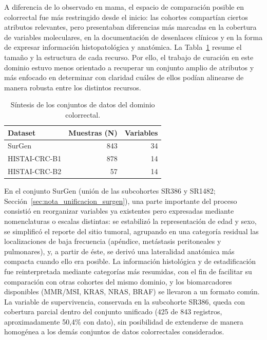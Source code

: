 A diferencia de lo observado en mama, el espacio de comparación posible en colorrectal fue más restringido desde el inicio: las cohortes compartían ciertos atributos relevantes, pero presentaban diferencias más marcadas en la cobertura de variables moleculares, en la documentación de desenlaces clínicos y en la forma de expresar información histopatológica y anatómica. La Tabla~\ref{tab:resumen_colorrectal} resume el tamaño y la estructura de cada recurso. Por ello, el trabajo de curación en este dominio estuvo menos orientado a recuperar un conjunto amplio de atributos y más enfocado en determinar con claridad cuáles de ellos podían alinearse de manera robusta entre los distintos recursos.

\begin{table}[H]
\centering
\caption{Síntesis de los conjuntos de datos del dominio colorrectal.}
\label{tab:resumen_colorrectal}
\small
\begin{tabular}{lrr}
\toprule
\textbf{Dataset} & \textbf{Muestras (N)} & \textbf{Variables} \\
\midrule
SurGen & 843 & 34 \\
HISTAI-CRC-B1 & 878 & 14 \\
HISTAI-CRC-B2 & 57 & 14 \\
\bottomrule
\end{tabular}
\end{table}

En el conjunto SurGen (unión de las subcohortes SR386 y SR1482; Sección~\ref{sec:nota_unificacion_surgen}), una parte importante del proceso consistió en reorganizar variables ya existentes pero expresadas mediante nomenclaturas o escalas distintas: se estabilizó la representación de edad y sexo, se simplificó el reporte del sitio tumoral, agrupando en una categoría residual las localizaciones de baja frecuencia (apéndice, metástasis peritoneales y pulmonares), y, a partir de éste, se derivó una lateralidad anatómica más compacta cuando ello era posible. La información histológica y de estadificación fue reinterpretada mediante categorías más resumidas, con el fin de facilitar su comparación con otras cohortes del mismo dominio, y los biomarcadores disponibles (MMR/MSI, KRAS, NRAS, BRAF) se llevaron a un formato común. La variable de supervivencia, conservada en la subcohorte SR386, queda con cobertura parcial dentro del conjunto unificado (425 de 843 registros, aproximadamente 50,4\% con dato), sin posibilidad de extenderse de manera homogénea a los demás conjuntos de datos colorrectales considerados.

